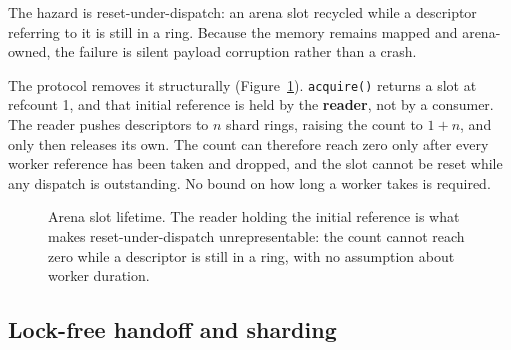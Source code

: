 \documentclass[conference]{IEEEtran}
\begin{document}
The hazard is reset-under-dispatch: an arena slot recycled while a descriptor referring to it
is still in a ring. Because the memory remains mapped and arena-owned, the failure is silent
payload corruption rather than a crash.

The protocol removes it structurally (Figure~\ref{fig:arena}). \texttt{acquire()} returns a
slot at refcount 1, and that initial reference is held by the \textbf{reader}, not by a
consumer. The reader pushes descriptors to $n$ shard rings, raising the count to $1 + n$, and
only then releases its own. The count can therefore reach zero only after every worker
reference has been taken and dropped, and the slot cannot be reset while any dispatch is
outstanding. No bound on how long a worker takes is required.

\begin{figure}[t]
\centering
{}
\caption{Arena slot lifetime. The reader holding the initial reference is what makes
reset-under-dispatch unrepresentable: the count cannot reach zero while a descriptor is still
in a ring, with no assumption about worker duration.}
\label{fig:arena}
\end{figure}

\subsection{Lock-free handoff and sharding}
\end{document}
